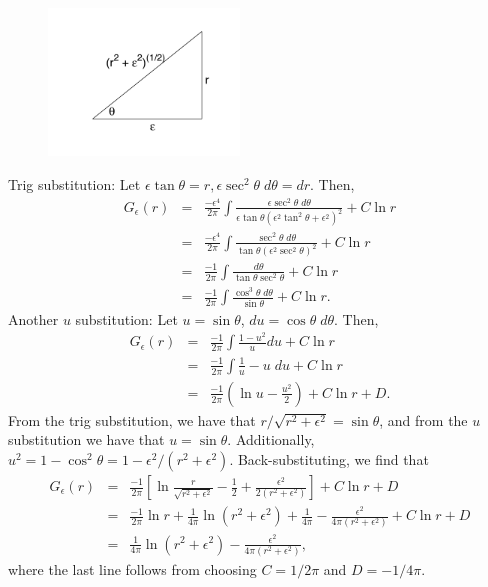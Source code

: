 \documentclass[12pt]{article}
\newcommand{\baas}[1]{\begin{eqnarray*} #1 \end{eqnarray*}}
\newcommand{\Ge}{G_\epsilon}
\newcommand{\eps}{\epsilon}
\begin{document}
\begin{figure}
	\begin{center}
\includegraphics[width=2.0in]{TrigSubsTriangle.pdf}
\end{center}
\end{figure}
Trig substitution: Let $\eps\tan\theta = r, \eps\sec^2\theta \;d\theta = dr$. Then,
\baas{
\Ge(r) &=& \frac{-\eps^4}{2\pi} \int \frac{\eps\sec^2\theta \; d\theta}{\eps \tan\theta (\eps^2 \tan^2\theta +  \eps^2)^2} + C\ln r \\
&=& \frac{-\eps^4}{2\pi} \int \frac{\sec^2 \theta \;d \theta}{\tan \theta (\eps^2\sec^2\theta)^2}+ C\ln r \\
&=& \frac{-1}{2\pi} \int \frac{d \theta}{\tan \theta \sec^2 \theta} + C\ln r \\
&=& \frac{-1}{2\pi} \int \frac{\cos^3 \theta \; d \theta}{\sin \theta} + C\ln r.
}
Another $u$ substitution: Let $u = \sin \theta$, $du = \cos \theta \; d\theta$. Then,
\baas{
\Ge(r) &=& \frac{-1}{2\pi} \int \frac{1-u^2}{u}du  + C\ln r\\
&=& \frac{-1}{2\pi} \int \frac{1}{u} - u \; du  + C\ln r \\
&=& \frac{-1}{2\pi} \left( \ln u - \frac{u^2}{2} \right)  + C\ln r + D.
}
From the trig substitution, we have that $r/\sqrt{r^2 + \eps^2} = \sin \theta$, and from the $u$ substitution we have that $u=\sin \theta$. Additionally, $u^2 = 1 - \cos^2 \theta = 1 - \eps^2/(r^2 + \eps^2)$. Back-substituting, we find that 
\baas{
\Ge(r) &=& \frac{-1}{2\pi} \left[ \ln \frac{r}{\sqrt{r^2 + \eps^2}} -\frac{1}{2} + \frac{\eps^2}{2(r^2 + \eps^2)} \right]  + C\ln r + D \\
&=& \frac{-1}{2\pi} \ln r + \frac{1}{4\pi}\ln(r^2 + \eps^2) + \frac{1}{4\pi} - \frac{\eps^2}{4\pi(r^2 + \eps^2)}  + C\ln r + D \\
&=& \frac{1}{4\pi}\ln(r^2 + \eps^2) - \frac{\eps^2}{4\pi(r^2 + \eps^2)},
}
where the last line follows from choosing $C = 1/2\pi$ and $D=-1/4\pi$.
\end{document}
